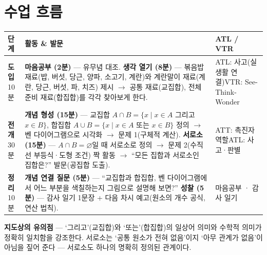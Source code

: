 \documentclass[11pt,a4paper]{article}
\begin{document}
\section{수업 흐름}
\begin{tabularx}{\linewidth}{@{}>{\centering\arraybackslash}p{1.6cm}X>{\raggedright\arraybackslash\small}p{3.1cm}@{}}
\toprule
\textbf{단계} & \textbf{활동 \& 발문} & \textbf{ATL / VTR} \\
\midrule
\textcolor{goldstrong}{\textbf{도입}}\newline\footnotesize 10분 &
\textbf{마음공부 (2분)} --- 유무념 대조.\newline
\textbf{생각 열기 (8분)} --- 볶음밥 재료(밥, 버섯, 당근, 양파, 소고기, 계란)와 계란말이 재료(계란, 당근, 버섯, 파, 치즈) 제시 $\to$ 공통 재료(교집합), 전체 준비 재료(합집합)를 각각 찾아보게 한다. &
ATL: 사고(실생활 연결)\newline VTR: See-Think-Wonder \\
\addlinespace
\textcolor{goldstrong}{\textbf{전개}}\newline\footnotesize 30분 &
\textbf{개념 형성 (15분)} --- 교집합 $A\cap B=\{x\mid x\in A$ 그리고 $x\in B\}$, 합집합 $A\cup B=\{x\mid x\in A$ 또는 $x\in B\}$ 정의 $\to$ 벤 다이어그램으로 시각화 $\to$ 문제 1(구체적 계산).\newline
\textbf{서로소 (15분)} --- $A\cap B=\varnothing$일 때 서로소로 정의 $\to$ 문제 2(수직선 부등식·도형 조건) 짝 활동 $\to$ ``모든 집합과 서로소인 집합은?'' 발문(공집합 도출). &
ATT: 촉진자 역할\newline ATL: 사고·판별 \\
\addlinespace
\textcolor{goldstrong}{\textbf{정리}}\newline\footnotesize 10분 &
\textbf{개념 연결 질문 (5분)} --- ``교집합과 합집합, 벤 다이어그램에서 어느 부분을 색칠하는지 그림으로 설명해 보면?''\newline
\textbf{성찰 (5분)} --- 감사 일기 1문장 + 다음 차시 예고(원소의 개수 공식, 연산 법칙). &
마음공부 · 감사 일기 \\
\bottomrule
\end{tabularx}

\begin{calloutbox}
\textbf{지도상의 유의점} --- `그리고'(교집합)와 `또는'(합집합)의 일상어 의미와 수학적 의미가 정확히 일치함을 강조한다. 서로소는 `공통 원소가 전혀 없음'이지 `아무 관계가 없음'이 아님을 짚어 준다 --- 서로소도 하나의 명확히 정의된 관계이다.
\end{calloutbox}
\end{document}
